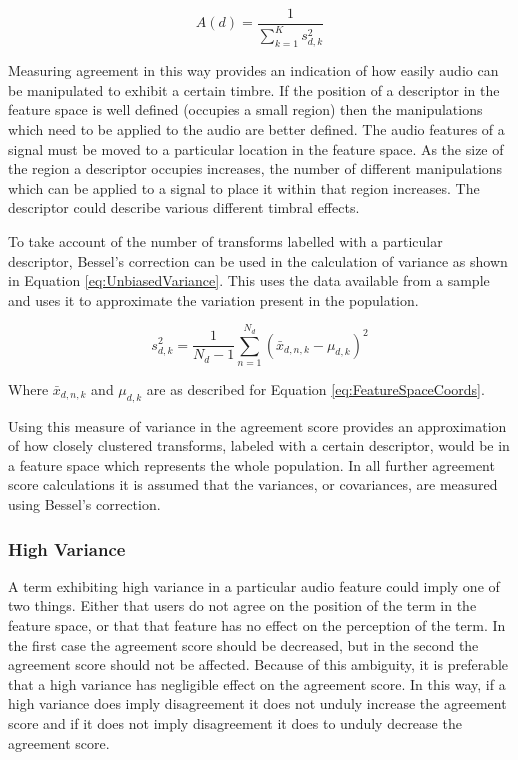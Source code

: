 			\begin{equation}
				A(d) = \frac{1}{\sum_{k = 1}^{K} s_{d,k}^{2}}
				\label{eq:ReciprocalOfSumAgreement}
			\end{equation}

			Measuring agreement in this way provides an indication of how easily audio can be manipulated to
			exhibit a certain timbre. If the position of a descriptor in the feature space is well defined
			(occupies a small region) then the manipulations which need to be applied to the audio are better
			defined. The audio features of a signal must be moved to a particular location in the feature
			space. As the size of the region a descriptor occupies increases, the number of different
			manipulations which can be applied to a signal to place it within that region increases. The
			descriptor could describe various different timbral effects.

			To take account of the number of transforms labelled with a particular descriptor, Bessel's
			correction can be used in the calculation of variance as shown in Equation
			\ref{eq:UnbiasedVariance}. This uses the data available from a sample and uses it to approximate
			the variation present in the population.

			\begin{equation}
				s_{d,k}^{2} = \frac{1}{N_{d} - 1} \sum_{n = 1}^{N_{d}} (\bar{x}_{d,n,k} - \mu_{d,k})^{2}
				\label{eq:UnbiasedVariance}
			\end{equation}

			Where $\bar{x}_{d,n,k}$ and $\mu_{d,k}$ are as described for Equation \ref{eq:FeatureSpaceCoords}.

			Using this measure of variance in the agreement score provides an approximation of how closely
			clustered transforms, labeled with a certain descriptor, would be in a feature space which
			represents the whole population. In all further agreement score calculations it is assumed that the
			variances, or covariances, are measured using Bessel's correction.

		\subsubsection*{High Variance}
			A term exhibiting high variance in a particular audio feature could imply one of two things. Either
			that users do not agree on the position of the term in the feature space, or that that feature has
			no effect on the perception of the term. In the first case the agreement score should be decreased,
			but in the second the agreement score should not be affected. Because of this ambiguity, it is
			preferable that a high variance has negligible effect on the agreement score. In this way, if a
			high variance does imply disagreement it does not unduly increase the agreement score and if it
			does not imply disagreement it does to unduly decrease the agreement score.
			
